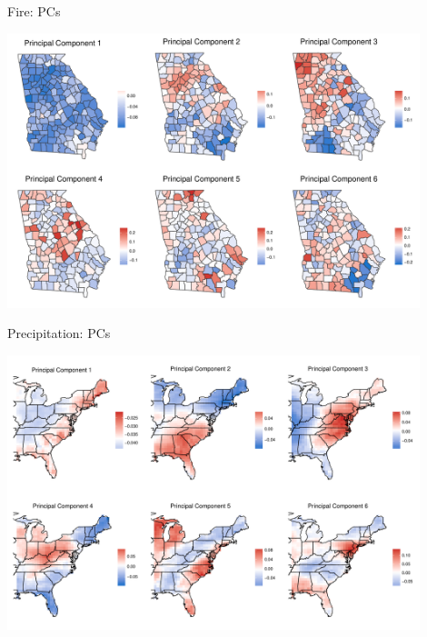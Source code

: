 \documentclass{beamer}
\begin{document}
\begin{frame}{Fire: PCs}
	\begin{center}
		\includegraphics[width=0.9\textwidth]{fire-eig-panel}
	\end{center}
\end{frame}

\begin{frame}{Precipitation: PCs}
	\begin{center}
		\includegraphics[width=0.9\textwidth]{precip-eig-panel}
	\end{center}
\end{frame}
\end{document}
